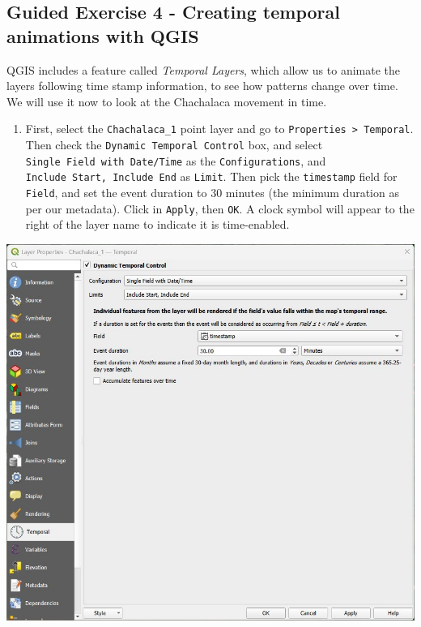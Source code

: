 \documentclass[
  letterpaper,
  DIV=11,
  numbers=noendperiod]{scrreprt}
\providecommand{\tightlist}{%
  \setlength{\itemsep}{0pt}\setlength{\parskip}{0pt}}\usepackage{longtable,booktabs,array}
\begin{document}
\subsection{Guided Exercise 4 - Creating temporal animations with
QGIS}\label{guided-exercise-4---creating-temporal-animations-with-qgis}

QGIS includes a feature called \emph{Temporal Layers}, which allow us to
animate the layers following time stamp information, to see how patterns
change over time. We will use it now to look at the Chachalaca movement
in time.

\begin{enumerate}
\def\labelenumi{(\arabic{enumi})}
\setcounter{enumi}{359}
\tightlist
\item
  First, select the \texttt{Chachalaca\_1} point layer and go to
  \texttt{Properties\ \textgreater{}\ Temporal}. Then check the
  \texttt{Dynamic\ Temporal\ Control} box, and select
  \texttt{Single\ Field\ with\ Date/Time} as the
  \texttt{Configurations}, and \texttt{Include\ Start,\ Include\ End} as
  \texttt{Limit}. Then pick the \texttt{timestamp} field for
  \texttt{Field}, and set the event duration to 30 minutes (the minimum
  duration as per our metadata). Click in \texttt{Apply}, then
  \texttt{OK}. A clock symbol will appear to the right of the layer name
  to indicate it is time-enabled.
\end{enumerate}

\includegraphics{images/lab_14/lab14_fig4_time_enabled.jpg}
\end{document}
